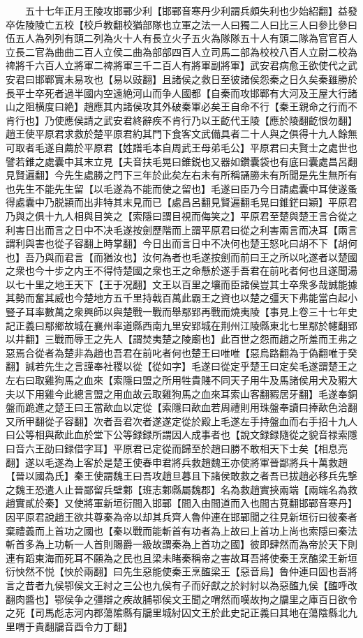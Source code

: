 　　五十七年正月王陵攻邯鄲少利【邯鄲音寒丹少利謂兵頗失利也少始紹翻】益發卒佐陵陵亡五校【校戶教翻校猶部隊也立軍之法一人曰獨二人曰比三人曰參比參曰伍五人為列列有頭二列為火十人有長立火子五火為隊隊五十人有頭二隊為官官百人立長二官為曲曲二百人立侯二曲為部部四百人立司馬二部為校校八百人立尉二校為禆將千六百人立將軍二禆將軍三千二百人有將軍副將軍】武安君病愈王欲使代之武安君曰邯鄲實未易攻也【易以豉翻】且諸侯之救日至彼諸侯怨秦之日久矣秦雖勝於長平士卒死者過半國内空遠絶河山而争人國都【自秦而攻邯鄲有大河及王屋大行諸山之阻横度曰絶】趙應其内諸侯攻其外破秦軍必矣王自命不行【秦王親命之行而不肯行也】乃使應侯請之武安君終辭疾不肯行乃以王齕代王陵【應於陵翻齕恨勿翻】趙王使平原君求救於楚平原君約其門下食客文武備具者二十人與之俱得十九人餘無可取者毛遂自薦於平原君【姓譜毛本自周武王母弟毛公】平原君曰夫賢士之處世也譬若錐之處囊中其末立見【夫音扶毛晃曰錐鋭也又器如鑽囊袋也有底曰囊處昌呂翻見賢遍翻】今先生處勝之門下三年於此矣左右未有所稱誦勝未有所聞是先生無所有也先生不能先生留【以毛遂為不能而使之留也】毛遂曰臣乃今日請處囊中耳使遂蚤得處囊中乃脱頴而出非特其末見而已【處昌呂翻見賢遍翻毛晃曰錐鋩曰穎】平原君乃與之俱十九人相與目笑之【索隱曰謂目視而侮笑之】平原君至楚與楚王言合從之利害日出而言之日中不决毛遂按劍歷階而上謂平原君曰從之利害兩言而决耳【兩言謂利與害也從子容翻上時掌翻】今日出而言日中不决何也楚王怒叱曰胡不下【胡何也】吾乃與而君言【而猶汝也】汝何為者也毛遂按劍而前曰王之所以叱遂者以楚國之衆也今十步之内王不得恃楚國之衆也王之命懸於遂手吾君在前叱者何也且遂聞湯以七十里之地王天下【王于况翻】文王以百里之壤而臣諸侯豈其士卒衆多哉誠能據其勢而奮其威也今楚地方五千里持戟百萬此霸王之資也以楚之彊天下弗能當白起小豎子耳率數萬之衆興師以與楚戰一戰而舉鄢郢再戰而燒夷陵【事見上卷三十七年史記正義曰鄢鄉故城在襄州率道縣西南九里安郢城在荆州江陵縣東北七里鄢於幰翻郢以井翻】三戰而辱王之先人【謂焚夷楚之陵廟也】此百世之怨而趙之所羞而王弗之惡焉合從者為楚非為趙也吾君在前叱者何也楚王曰唯唯【惡烏路翻為于偽翻唯于癸翻】誠若先生之言謹奉社稷以從【從如字】毛遂曰從定乎楚王曰定矣毛遂謂楚王之左右曰取雞狗馬之血來【索隱曰盟之所用牲貴賤不同天子用牛及馬諸侯用犬及豭大夫以下用雞今此總言盟之用血故云取雞狗馬之血來耳索山客翻豭居牙翻】毛遂奉銅盤而跪進之楚王曰王當歃血以定從【索隱曰歃血若周禮則用珠盤奉讀曰捧歃色洽翻又所甲翻從子容翻】次者吾君次者遂遂定從於殿上毛遂左手持盤血而右手招十九人曰公等相與歃此血於堂下公等録録所謂因人成事者也【說文録録隨從之貌音禄索隱曰音六王劭曰録借字耳】平原君已定從而歸至於趙曰勝不敢相天下士矣【相息亮翻】遂以毛遂為上客於是楚王使春申君將兵救趙魏王亦使將軍晉鄙將兵十萬救趙【晉以國為氏】秦王使謂魏王曰吾攻趙旦暮且下諸侯敢救之者吾已拔趙必移兵先撃之魏王恐遣人止晉鄙留兵壁鄴【班志鄴縣屬魏郡】名為救趙實挾兩端【兩端名為救趙實貳於秦】又使將軍新垣衍間入邯鄲【間入由間道而入也間古莧翻邯鄲音寒丹】因平原君說趙王欲共尊秦為帝以却其兵齊人魯仲連在邯鄲聞之往見新垣衍曰彼秦者棄禮義而上首功之國也【秦以戰而能斬首有功者為上故曰上首功上尚也索隱曰秦法斬首多為上功斬一人首則賜爵一級故謂秦為上首功之國】彼即肆然而為帝於天下則連有蹈東海而死耳不願為之民也且梁未睹秦稱帝之害故耳吾將使秦王烹醢梁王新垣衍怏然不悦【怏於兩翻】曰先生惡能使秦王烹醢梁王【惡音烏】魯仲連曰固也吾將言之昔者九侯鄂侯文王紂之三公也九侯有子而好獻之於紂紂以為惡醢九侯【醢呼改翻肉醬也】鄂侯争之彊辯之疾故脯鄂侯文王聞之喟然而嘆故拘之牖里之庫百日欲令之死【司馬彪志河内郡蕩隂縣有牖里城紂囚文王於此史記正義曰其地在蕩陰縣北九里喟于貴翻牖音酉令力丁翻】